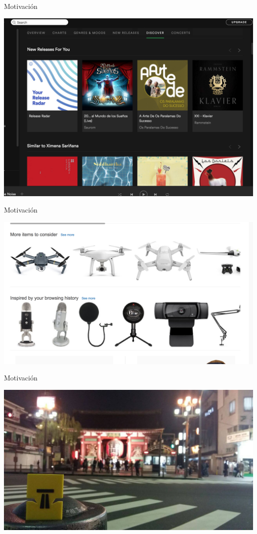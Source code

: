 \documentclass{beamer}
\begin{document}
\begin{frame}{Motivación}
    \begin{center}
        \includegraphics[width=\linewidth]{Images/ml4}
    \end{center}
\end{frame}

\begin{frame}{Motivación}
    \begin{center}
        \includegraphics[width=\linewidth]{Images/ml5}
    \end{center}
\end{frame}


\begin{frame}{Motivación}
    \begin{center}
        \includegraphics[width=0.9\linewidth]{Images/ml3}
    \end{center}
\end{frame}
\end{document}
